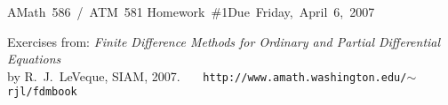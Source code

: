 \documentclass[11pt]{article}
\begin{document}


\hfill\vbox{\hbox{AMath 586 / ATM 581}
\hbox{Homework \#1}\hbox{Due Friday, April 6, 2007}}

\vskip 10pt
\noindent
Exercises from: {\it Finite Difference Methods for Ordinary and Partial 
Differential Equations}\\  by R.~J.~LeVeque, SIAM, 2007.~~~
{\tt http://www.amath.washington.edu/$\sim$rjl/fdmbook}
\vskip 10pt










\end{document}
